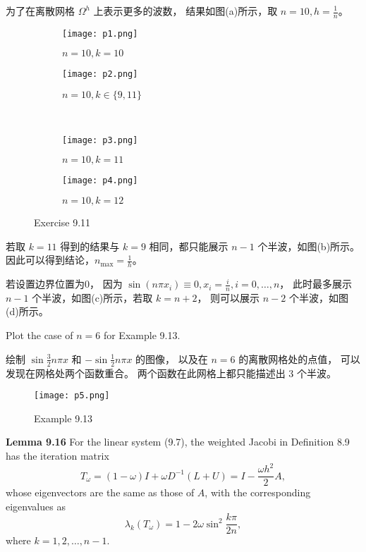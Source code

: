 \documentclass[lang=cn,a4paper,newtx,bibend=bibtex]{elegantpaper}
\begin{document}
\begin{solution}
  为了在离散网格 $\Omega^h$ 上表示更多的波数，
  结果如图(a)所示，取 $n = 10, h = \frac{1}{n}$。
  \begin{figure}[H]
    \centering
    \begin{subfigure}[b]{0.38\textwidth}
        \texttt{[image: p1.png]}
        \caption{$n = 10, k = 10$}
    \end{subfigure}
    \begin{subfigure}[b]{0.38\textwidth}
        \texttt{[image: p2.png]}
        \caption{$n = 10, k \in \{9,11\}$}
    \end{subfigure}
    \\
    \begin{subfigure}[b]{0.38\textwidth}
      \texttt{[image: p3.png]}
      \caption{$n = 10, k = 11$}
  \end{subfigure}
  \begin{subfigure}[b]{0.38\textwidth}
      \texttt{[image: p4.png]}
      \caption{$n = 10, k = 12$}
  \end{subfigure}
  \caption{Exercise 9.11}
  \end{figure}
  若取 $k = 11$ 得到的结果与 $k = 9$ 相同，都只能展示 $n - 1$ 个半波，如图(b)所示。
  因此可以得到结论，$n_{\max} = \frac{1}{h}$。

  若设置边界位置为0，
  因为 $\sin(n\pi x_i) \equiv 0, x_i = \frac{i}{n}, i = 0, \dots, n$，
  此时最多展示 $n - 1$ 个半波，如图(c)所示，若取 $k = n + 2$，
  则可以展示 $n - 2$ 个半波，如图(d)所示。
\end{solution}

\begin{prob}[Exercise 9.14]
  Plot the case of $n = 6$ for Example 9.13.
\end{prob}

\begin{solution}
  绘制 $\sin \frac32 n \pi x$ 和 $-\sin\frac12 n \pi x$ 的图像，
  以及在 $n = 6$ 的离散网格处的点值，
  可以发现在网格处两个函数重合。
  两个函数在此网格上都只能描述出 3 个半波。

  \begin{figure}[H]
    \centering
    \texttt{[image: p5.png]}
    \caption{Example 9.13}
  \end{figure}
\end{solution}

\begin{prob}[Exercise 9.17]
  \textbf{Lemma 9.16} \quad For the linear system (9.7), the
  weighted Jacobi in Definition 8.9 has the iteration matrix
\[
  T_{\omega} = (1 - \omega)I + \omega D^{-1} (L + U) = I - \dfrac{\omega h^2}2 A,
\]
whose eigenvectors are the same as those of $A$, with the corresponding eigenvalues as
\[
  \lambda_k (T_{\omega}) = 1 - 2\omega \sin^2 \dfrac{k\pi}{2n},
\]
where $k = 1, 2, \ldots, n - 1$.
\end{prob}
\end{document}
